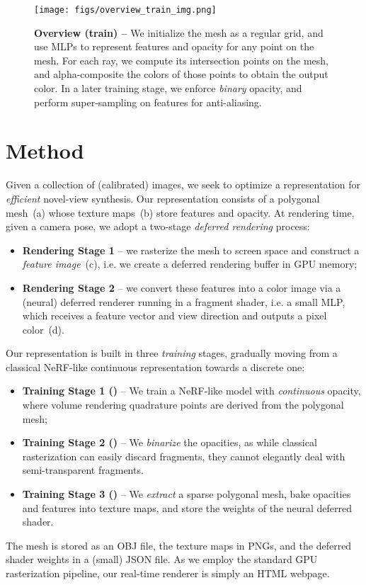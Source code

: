 \begin{figure*}[t!]
\begin{center}
\texttt{[image: figs/overview\_train\_img.png]}
\end{center}
\caption{
\textbf{Overview (train) -- } 
We initialize the mesh as a regular grid, and use MLPs to represent features and opacity for any point on the mesh.
For each ray, we compute its intersection points on the mesh, and alpha-composite the colors of those points to obtain the output color.
In a later training stage, we enforce \textit{binary} opacity, and perform super-sampling on features for anti-aliasing.
}
\label{fig:overview_train}
\end{figure*}
 \section{Method}
\label{sec:method}
\label{sec:method_overview}
Given a collection of (calibrated) images, we seek to optimize a representation for \textit{efficient} novel-view synthesis.
Our representation consists of a polygonal mesh~(a) whose texture maps~(b) store features and opacity.
At rendering time, given a camera pose, we adopt a two-stage \textit{deferred rendering} process:
\begin{itemize}
\item \textbf{Rendering Stage 1} -- we rasterize the mesh to screen space and construct a \textit{feature image}~(c), i.e. we create a deferred rendering buffer in GPU memory;
\item \textbf{Rendering Stage 2} -- we convert these features into a color image via a (neural) deferred renderer running in a fragment shader, i.e. a small MLP, which receives a feature vector and view direction and outputs a pixel color~(d).
\end{itemize}
Our representation is built in three \textit{training} stages, gradually moving from a classical NeRF-like continuous representation towards a discrete one:
\begin{itemize}
\item \textbf{Training Stage 1 ()} -- We train a NeRF-like model with \textit{continuous} opacity, where volume rendering quadrature points are derived from the polygonal mesh;
\item \textbf{Training Stage 2 ()} -- We \textit{binarize} the opacities, as while classical rasterization can easily discard fragments, they cannot elegantly deal with semi-transparent fragments.
\item \textbf{Training Stage 3 ()} -- We \textit{extract} a sparse polygonal mesh, bake opacities and features into texture maps, and store the weights of the neural deferred shader.
\end{itemize}
The mesh is stored as an OBJ file, the texture maps in PNGs, and the deferred shader weights in a (small) JSON file.
As we employ the standard GPU rasterization pipeline, our real-time renderer is simply an HTML webpage.

